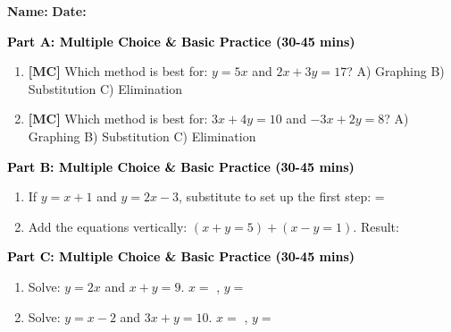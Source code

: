 \documentclass[12pt, letterpaper, fleqn]{article}
\newcommand{\blank}{\underline{\hspace{2.2cm}}}
\begin{document}
\textbf{Name:} \underline{\hspace{5cm}}
\hfill
\textbf{Date:} \underline{\hspace{3cm}}\\


\begin{tcolorbox}[colback=customteal!20]
\large\textcolor{black}{\textbf{Part A: Multiple Choice \& Basic Practice (30-45 mins)}}
\end{tcolorbox}

\vspace{3mm}

\begin{enumerate}[itemsep=2.5cm, leftmargin=0.6cm]
\item \textbf{[MC]} Which method is best for: $y = 5x$ and $2x + 3y = 17$?
A) Graphing B) Substitution C) Elimination
\item \textbf{[MC]} Which method is best for: $3x + 4y = 10$ and $-3x + 2y = 8$?
A) Graphing B) Substitution C) Elimination
\end{enumerate}

\newpage

\begin{tcolorbox}[colback=customteal!20]
\large\textcolor{black}{\textbf{Part B: Multiple Choice \& Basic Practice (30-45 mins)}}
\end{tcolorbox}

\vspace{3mm}

\begin{enumerate}[itemsep=2.5cm, leftmargin=0.6cm, resume]
\item If $y = x+1$ and $y = 2x-3$, substitute to set up the first step: \blank = \blank
\item Add the equations vertically: $(x+y=5) + (x-y=1)$. Result: \blank
\end{enumerate}

\newpage

\begin{tcolorbox}[colback=customteal!20]
\large\textcolor{black}{\textbf{Part C: Multiple Choice \& Basic Practice (30-45 mins)}}
\end{tcolorbox}

\vspace{3mm}

\begin{enumerate}[itemsep=2.5cm, leftmargin=0.6cm, resume]
\item Solve: $y = 2x$ and $x + y = 9$. $x=$ \blank, $y=$ \blank
\item Solve: $y = x-2$ and $3x + y = 10$. $x=$ \blank, $y=$ \blank
\end{enumerate}
\end{document}
